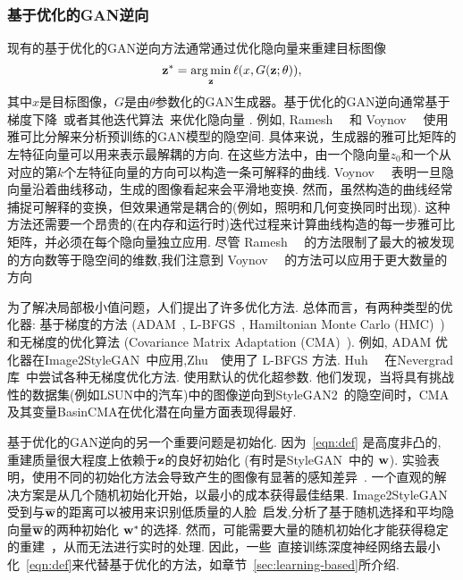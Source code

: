 \subsubsection{基于优化的GAN逆向}
\label{sec:optimization-based}

现有的基于优化的GAN逆向方法通常通过优化隐向量来重建目标图像
\begin{equation}
\z^* = \underset{\z}{\arg\min}\, \ell(x, G(\z; \theta)),
\label{eqn:opt}
\end{equation}
其中$x$是目标图像，$G$是由$\theta$参数化的GAN生成器。基于优化的GAN逆向通常基于梯度下降~\cite{creswell2018inverting,lipton2017precise,ma2018invertibility,creswell2018inverting,abdal2019image2stylegan,abdal2020image2stylegan2,lipton2017precise}或者其他迭代算法~\cite{voynov2020latent, ramesh2018spectral}来优化隐向量 .
例如, Ramesh~\etal~\cite{ramesh2018spectral} 和 Voynov~\etal~\cite{voynov2020latent} 使用雅可比分解来分析预训练的GAN模型的隐空间. 
具体来说，生成器的雅可比矩阵的左特征向量可以用来表示最解耦的方向. 
在这些方法中，由一个隐向量$z_0$和一个从对应的第$k$个左特征向量的方向可以构造一条可解释的曲线. 
Voynov~\etal~\cite{voynov2020latent} 表明一旦隐向量沿着曲线移动，生成的图像看起来会平滑地变换. 
然而，虽然构造的曲线经常捕捉可解释的变换，但效果通常是耦合的(例如，照明和几何变换同时出现). 
这种方法还需要一个昂贵的(在内存和运行时)迭代过程来计算曲线构造的每一步雅可比矩阵，并必须在每个隐向量独立应用. 
尽管 Ramesh~\etal~\cite{ramesh2018spectral} 的方法限制了最大的被发现的方向数等于隐空间的维数,我们注意到 Voynov~\etal~\cite{voynov2020latent} 的方法可以应用于更大数量的方向
 
为了解决局部极小值问题，人们提出了许多优化方法. 总体而言，有两种类型的优化器: 基于梯度的方法 (ADAM~\cite{kingma2014adam}, L-BFGS~\cite{liu1989limited}, Hamiltonian Monte Carlo (HMC)~\cite{duane1987hybrid}) 和无梯度的优化算法 (Covariance Matrix Adaptation (CMA)~\cite{hansen2001cma}).
例如, ADAM 优化器在Image2StyleGAN~\cite{abdal2019image2stylegan}中应用,Zhu~\etal~\cite{zhu2016generative}使用了 L-BFGS 方法.
Huh~\etal~\cite{huh2020transforming} 在Nevergrad库~\cite{nevergrad}中尝试各种无梯度优化方法. 使用默认的优化超参数. 他们发现，当将具有挑战性的数据集(例如LSUN中的汽车)中的图像逆向到StyleGAN2~\cite{karras2020analyzing}的隐空间时，CMA及其变量BasinCMA在优化潜在向量方面表现得最好.

基于优化的GAN逆向的另一个重要问题是初始化. 
因为~\eqref{eqn:def} 是高度非凸的, 重建质量很大程度上依赖于$\mathbf{z}$的良好初始化 (有时是StyleGAN~\cite{karras2019style}中的 $\mathbf{w}$).
实验表明，使用不同的初始化方法会导致产生的图像有显著的感知差异~\cite{radford2016dcgan,brock2018large,karras2017progressive,karras2019style}. 
一个直观的解决方案是从几个随机初始化开始，以最小的成本获得最佳结果. 
Image2StyleGAN~\cite{abdal2019image2stylegan} 受到与$\overline{\mathbf{w}}$的距离可以被用来识别低质量的人脸~\cite{karras2019style}启发,分析了基于随机选择和平均隐向量$\overline{\mathbf{w}}$的两种初始化 $\mathbf{w}^{*}$的选择. 
然而，可能需要大量的随机初始化才能获得稳定的重建~\cite{zhu2016generative}，从而无法进行实时的处理. 
因此，一些~\cite{zhu2016generative,tewari2020stylerig,guan2020faster}直接训练深度神经网络去最小化~\eqref{eqn:def}来代替基于优化的方法，如章节~\ref{sec:learning-based}所介绍.

